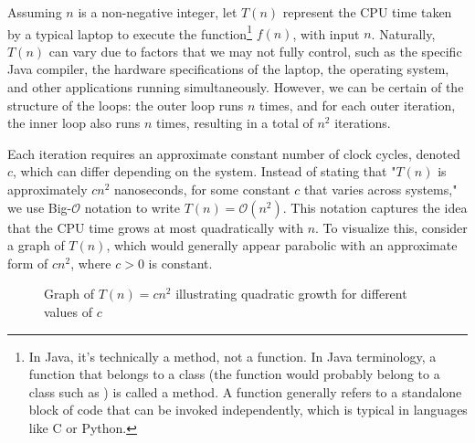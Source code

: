 Assuming $n$ is a non-negative integer, let $T(n)$ represent the CPU time taken by a typical laptop to execute the function\footnote{In Java, it's technically a method, not a function. In Java terminology, a function that belongs to a class (the function would probably belong to a class such as ) is called a method. A function generally refers to a standalone block of code that can be invoked independently, which is typical in languages like C or Python.}  $f(n)$, with input $n$. Naturally, $T(n)$ can vary due to factors that we may not fully control, such as the specific Java compiler, the hardware specifications of the laptop, the operating system, and other applications running simultaneously. However, we can be certain of the structure of the loops: the outer loop runs $n$ times, and for each outer iteration, the inner loop also runs $n$ times, resulting in a total of $n^2$ iterations. 

Each iteration requires an approximate constant number of clock cycles, denoted \( c \), which can differ depending on the system. Instead of stating that "$T(n)$ is approximately \( cn^2 \) nanoseconds, for some constant \( c \) that varies across systems," we use Big-$\mathcal{O}$ notation to write \( T(n) = \mathcal{O}(n^2) \). This notation captures the idea that the CPU time grows at most quadratically with \( n \). To visualize this, consider a graph of \( T(n) \), which would generally appear parabolic with an approximate form of \( cn^2 \), where \( c > 0 \) is constant.

\begin{figure}[h]
    \centering
    \caption{Graph of $T(n) = cn^2$ illustrating quadratic growth for different values of $c$}
    \label{fig:quadratic_growth}
\end{figure}

